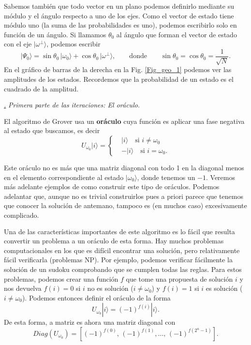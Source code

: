 \documentclass[a4paper,11pt]{book} %
\numberwithin{equation}{chapter}
\def\lc{\left[}
\def\rc{\right]}
\def\lch{\left\{}
\def\subsubiContadorIt{\par\addtocounter{subsubsection}{1}\underline{\it\thesubsubsection.}\hskip0.5cm \setcounter{subsubsubsectionIt}{0}}
\newcommand{\SubsubiIt}[1]{
		\subsubiContadorIt \textit{#1}
	}
\newcounter{subsubsubsectionIt}[subsubsection]
\begin{document}
Sabemos también que todo vector en un plano podemos definirlo mediante su módulo y el ángulo respecto a uno de los ejes. Como el vector de estado tiene módulo uno (la suma de las probabilidades es uno), podemos escribirlo solo en función de un ángulo. Si llamamos $\theta_0$ al ángulo que forman el vector de estado con el eje $| \omega^{\perp} \rangle$, podemos escribir
\begin{equation} \label{ec_geo_theta}
| \Psi_0 \rangle = \sin \theta_0 \, |\omega_0 \rangle + \cos \theta_0 \, | \omega^{\perp} \rangle, \qquad \text{donde} \qquad  \boxed{\sin \theta_0 =  \cos \theta_0 = \frac{1}{\sqrt{N}}}.
\end{equation}
En el gráfico de barras de la derecha en la Fig. \ref{Fig_geo_1} podemos ver las amplitudes de los estados. Recordemos que la probabilidad de un estado es el cuadrado de la amplitud.


\SubsubiIt{Primera parte de las iteraciones: El oráculo.}

El algoritmo de Grover usa un \textbf{oráculo} cuya función es aplicar una fase negativa al estado que buscamos, es decir
\begin{equation} \label{ec_geo_Uw}
\boxed{U_{\omega_0} | i \rangle = 
	\lch
		\begin{matrix}
			& | i \rangle \quad \text{si } i \neq \omega_0 \\
			& - | i \rangle \quad \text{si } i = \omega_0.
		\end{matrix}
	\right.}
\end{equation}

Este oráculo no es más que una matriz diagonal con todo 1 en la diagonal menos en el elemento correspondiente al estado $| \omega_0 \rangle$, donde tenemos un $-1$. Veremos más adelante ejemplos de como construir este tipo de oráculos. Podemos adelantar que, aunque no es trivial construirlos pues a priori parece que tenemos que conocer la solución de antemano, tampoco es (en muchos caso) excesivamente complicado. 

Una de las características importantes de este algoritmo es lo fácil que resulta convertir un problema a un oráculo de esta forma. Hay muchos problemas computacionales en los que es difícil encontrar una solución, pero relativamente fácil verificarla (problemas NP). Por ejemplo, podemos verificar fácilmente la solución de un sudoku comprobando que se cumplen todas las reglas. Para estos problemas, podemos crear una función $f$ que tome una propuesta de solución $i$ y nos devuelva $f(i)=0$ si $i$ no es solución ($i \neq  \omega_0$) y $f(i) = 1$ si $i$ es solución ($i \neq  \omega_0$). Podemos entonces definir el oráculo de la forma
\begin{equation} \label{ec_geo_U_f}
\boxed{U_{\omega_0} |i \rangle = (-1)^{f(i)} |i \rangle}.
\end{equation}
De esta forma, a matriz es ahora una matriz diagonal con 
\begin{equation}
Diag(U_{\omega_0})=\lc (-1)^{f(0)}, \, (-1)^{f(1)}, \dots , \, (-1)^{f(2^n-1)}    \rc .
\end{equation}
\end{document}
